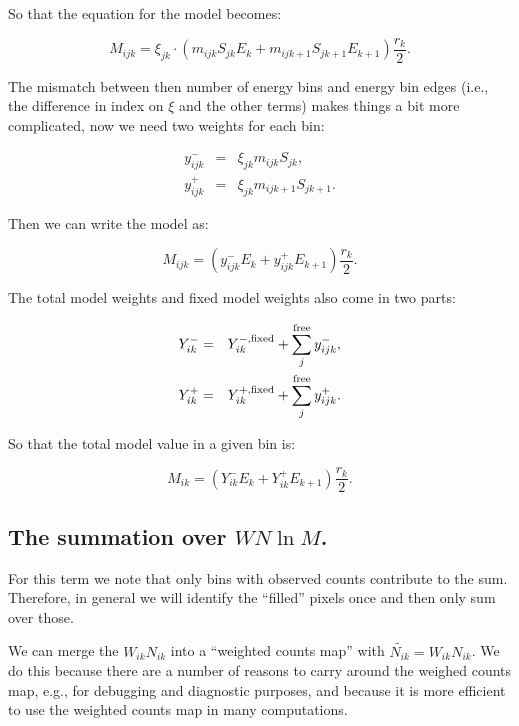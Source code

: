 \documentclass[preprint]{aastex}
\begin{document}
\noindent So that the equation for the model becomes:

\begin{equation}
  M_{ijk} = \xi_{jk} \cdot (m_{ijk} S_{jk} E_k +  m_{ijk+1} S_{jk+1} E_{k+1}) \frac{r_k}{2}.
\end{equation}

The mismatch between then number of energy bins and energy bin edges
(i.e., the difference in index on $\xi$ and the other terms) makes
things a bit more complicated, now we need two weights for each bin:

\begin{eqnarray}
  y_{ijk}^{-} & = & \xi_{jk} m_{ijk} S_{jk}, \nonumber \\
  y_{ijk}^{+} & = & \xi_{jk} m_{ijk+1} S_{jk+1}.
\end{eqnarray}

\noindent Then we can write the model as:

\begin{equation}
  M_{ijk} = ( y_{ijk}^{-} E_k + y_{ijk}^{+} E_{k+1} ) \frac{r_k}{2}.
\end{equation}

\noindent The total model weights and fixed model weights
also come in two parts:

\begin{eqnarray}
  Y_{ik}^{-} & = & Y_{ik}^{-,\rm fixed} + \sum_j^{\rm free} y_{ijk}^{-}, \nonumber \\
  Y_{ik}^{+} & = & Y_{ik}^{+,\rm fixed} + \sum_j^{\rm free} y_{ijk}^{+}.
\end{eqnarray}

\noindent So that the total model value in a given bin is:

\begin{equation}
  M_{ik} = ( Y_{ik}^{-} E_k + Y_{ik}^{+} E_{k+1} ) \frac{r_k}{2}.
\end{equation}


\subsection{The summation over \texorpdfstring{$W N \ln M$}{WN ln M}.}\label{subsec:like_sum1}

For this term we note that only bins with observed counts contribute
to the sum.  Therefore, in general we will identify the ``filled''
pixels once and then only sum over those.

We can merge the $W_{ik} N_{ik}$ into a ``weighted counts map'' with
$\tilde{N_{ik}} = W_{ik} N_{ik}$.  We do this because there are a
number of reasons to carry around the weighed counts map, e.g., for
debugging and diagnostic purposes, and because it is more efficient to
use the weighted counts map in many computations.
\end{document}
